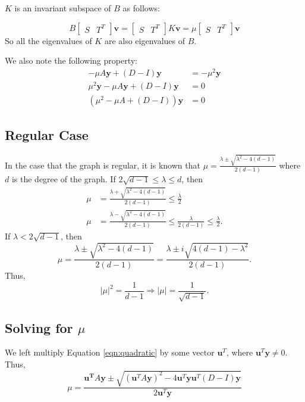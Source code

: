 \documentclass[11pt]{article}
\begin{document}
$K$ is an invariant subspace of $B$ as follows:

\begin{equation}
    B\begin{bmatrix}S&T^T\end{bmatrix}\mathbf{v}=\begin{bmatrix}S&T^T\end{bmatrix}K\mathbf{v}=\mu\begin{bmatrix}S&T^T\end{bmatrix}\mathbf{v}
\end{equation}
So all the eigenvalues of $K$ are also eigenvalues of $B$.

We also note the following property:
\begin{align}
    -\mu A\mathbf{y} + (D-I)\mathbf{y}&= -\mu^2\mathbf{y}\\
    \mu^2\mathbf{y} - \mu A\mathbf{y} + (D-I)\mathbf{y} &= 0\\
    (\mu^2 - \mu A + (D-I))\mathbf{y} &= 0
\label{eqn:quadratic}
\end{align}

\subsection{Regular Case}

In the case that the graph is regular, it is known that $\mu=\frac{\lambda\pm\sqrt{\lambda^2-4(d-1)}}{2(d-1)}$ where $d$ is the degree of the graph.
If $2\sqrt{d-1}\leq\lambda\leq d$, then
\begin{align}
    \mu&=\frac{\lambda+\sqrt{\lambda^2-4(d-1)}}{2(d-1)}\leq\frac{\lambda}{2}\\
    \mu&=\frac{\lambda-\sqrt{\lambda^2-4(d-1)}}{2(d-1)}\leq\frac{\lambda}{2(d-1)}\leq\frac{\lambda}{2}.
\end{align}
If $\lambda<2\sqrt{d-1}$, then
\begin{equation}
    \mu=\frac{\lambda\pm\sqrt{\lambda^2-4(d-1)}}{2(d-1)}=\frac{\lambda\pm i\sqrt{4(d-1)-\lambda^2}}{2(d-1)}.
\end{equation}
Thus,
\[|\mu|^2=\frac{1}{d-1}\Rightarrow|\mu|=\frac{1}{\sqrt{d-1}}.\]
\subsection{Solving for $\mu$}

We left multiply Equation \ref{eqn:quadratic} by some vector $\mathbf{u}^T$, where $\mathbf{u}^T\mathbf{y}\neq 0$.
Thus,
\begin{equation}
    \mu = \frac{\mathbf{u^T}A\mathbf{y}\pm\sqrt{(\mathbf{u}^TA\mathbf{y})^2-4\mathbf{u}^T\mathbf{y}\mathbf{u}^T(D-I)\mathbf{y}}}{2\mathbf{u}^T\mathbf{y}}
\end{equation}
\end{document}
